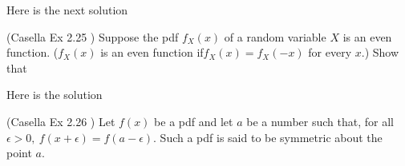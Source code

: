 \documentclass[12pt,letterpaper]{exam}
\begin{document}
\begin{questions}
	
	\begin{solution}
		Here is the next solution
	\end{solution}

	\question (Casella Ex 2.25 ) Suppose the pdf  $f_X(x)$ of a random variable $X$ is an even function. ($f_X(x)$ is an even function if$f_X(x) = f_X(-x)$ for every $x$.) Show that 
	
	\begin{solution}
		Here is the solution
	\end{solution}
	
	\question  (Casella Ex 2.26 ) Let $f(x)$ be a pdf and let $a$ be a number such that, for all $\epsilon > 0, \ f(x+\epsilon) = f(a-\epsilon)$. Such a pdf is said to be symmetric about the point $a$.
	
\end{questions}
\end{document}
